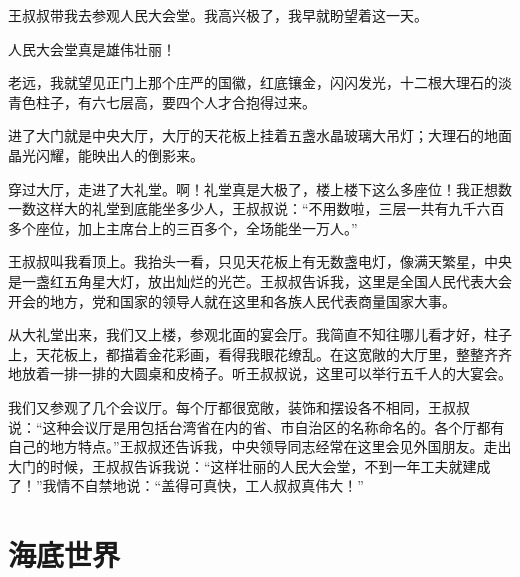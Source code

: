 \documentclass[12pt,UTF-8,openany]{ctexbook}
\begin{document}
\begin{large}
    
    王叔叔带我去参观人民大会堂。我高兴极了，我早就盼望着这一天。
    
    人民大会堂真是雄伟壮丽！
    
    老远，我就望见正门上那个庄严的国徽，红底镶金，闪闪发光，十二根大理石的淡青色柱子，有六七层高，要四个人才合抱得过来。
    
    进了大门就是中央大厅，大厅的天花板上挂着五盏水晶玻璃大吊灯；大理石的地面晶光闪耀，能映出人的倒影来。
    
    穿过大厅，走进了大礼堂。啊！礼堂真是大极了，楼上楼下这么多座位！我正想数一数这样大的礼堂到底能坐多少人，王叔叔说：“不用数啦，三层一共有九千六百多个座位，加上主席台上的三百多个，全场能坐一万人。”
    
    王叔叔叫我看顶上。我抬头一看，只见天花板上有无数盏电灯，像满天繁星，中央是一盏红五角星大灯，放出灿烂的光芒。王叔叔告诉我，这里是全国人民代表大会开会的地方，党和国家的领导人就在这里和各族人民代表商量国家大事。
    
    从大礼堂出来，我们又上楼，参观北面的宴会厅。我简直不知往哪儿看才好，柱子上，天花板上，都描着金花彩画，看得我眼花缭乱。在这宽敞的大厅里，整整齐齐地放着一排一排的大圆桌和皮椅子。听王叔叔说，这里可以举行五千人的大宴会。
    
    我们又参观了几个会议厅。每个厅都很宽敞，装饰和摆设各不相同，王叔叔说：“这种会议厅是用包括台湾省在内的省、市自治区的名称命名的。各个厅都有自己的地方特点。”王叔叔还告诉我，中央领导同志经常在这里会见外国朋友。走出大门的时候，王叔叔告诉我说：“这样壮丽的人民大会堂，不到一年工夫就建成了！”我情不自禁地说：“盖得可真快，工人叔叔真伟大！”
    
\end{large}



\chapter{海底世界}
\end{document}
